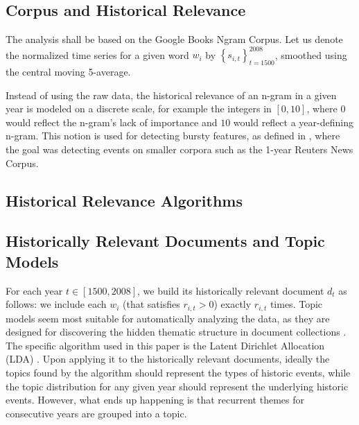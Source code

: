 
\subsection{Corpus and Historical Relevance}

The analysis shall be based on the Google Books Ngram Corpus. Let us denote the normalized time series for a given word $w_i$ by $\left\{ s_{i, t} \right\}_{t = 1500}^{2008}$, smoothed using the central moving 5-average.

Instead of using the raw data, the historical relevance of an n-gram in a given year is modeled on a discrete scale, for example the integers in $\left[ 0, 10 \right]$, where $0$ would reflect the n-gram's lack of importance and $10$ would reflect a year-defining n-gram. This notion is used for detecting bursty features, as defined in , where the goal was detecting events on smaller corpora such as the 1-year Reuters News Corpus.

\subsection{Historical Relevance Algorithms}
\label{sec:historical-relevance-algorithms}


\subsection{Historically Relevant Documents and Topic Models}

For each year $t \in \left[ 1500, 2008 \right]$, we build its historically relevant document $d_t$ as follows: we include each $w_i$ (that satisfies $r_{i, t} > 0$) exactly $r_{i, t}$ times. Topic models seem most suitable for automatically analyzing the data, as they are designed for discovering the hidden thematic structure in document collections . The specific algorithm used in this paper is the Latent Dirichlet Allocation (LDA) . Upon applying it to the historically relevant documents, ideally the topics found by the algorithm should represent the types of historic events, while the topic distribution for any given year should represent the underlying historic events. However, what ends up happening is that recurrent themes for consecutive years are grouped into a topic.
